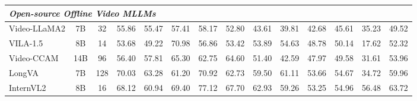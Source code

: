 \begin{table}[ht]
{\begin{tabular}{lccccccccccccc}
\multicolumn{14}{l}{\textit{Open-source Offline Video MLLMs}}                                                                                                                                                                                                                                                                                                                                                                                                  \\ \midrule
Video-LLaMA2    \cite{cheng2024videollama2}            & 7B            & \multicolumn{1}{c|}{32}                & 55.86                        & 55.47                        & 57.41                        & 58.17                        & 52.80                        & 43.61                        & 39.81                        & 42.68                        & 45.61                        & \multicolumn{1}{c|}{35.23}                        & 49.52                        \\
VILA-1.5   \cite{lin2024vila}                 & 8B            & \multicolumn{1}{c|}{14}                & 53.68                        & 49.22                        & 70.98                        & 56.86                        & 53.42                        & 53.89                        & 54.63                        & 48.78                        & 50.14                        & \multicolumn{1}{c|}{17.62}                        & 52.32                        \\
Video-CCAM  \cite{fei2024videoccam}                & 14B           & \multicolumn{1}{c|}{96}                & 56.40                        & 57.81                        & 65.30                        & 62.75                        & 64.60                        & 51.40                        & 42.59                        & 47.97                        & 49.58                        & \multicolumn{1}{c|}{31.61}                        & 53.96                        \\
LongVA   \cite{zhang2024longva}                   & 7B            & \multicolumn{1}{c|}{128}               & 70.03                        & 63.28                        & 61.20                        & 70.92                        & 62.73                        & 59.50                        & 61.11                        & 53.66                        & 54.67                        & \multicolumn{1}{c|}{34.72}                        & 59.96                        \\
InternVL2 \cite{chen2024internvl2}                & 8B            & \multicolumn{1}{c|}{16}                & 68.12                        & 60.94                        & 69.40                        & 77.12                        & 67.70                        & 62.93                        & 59.26                        & 53.25                        & 54.96                        & \multicolumn{1}{c|}{56.48}                        & 63.72                        \\

\end{tabular}}
\end{table}
